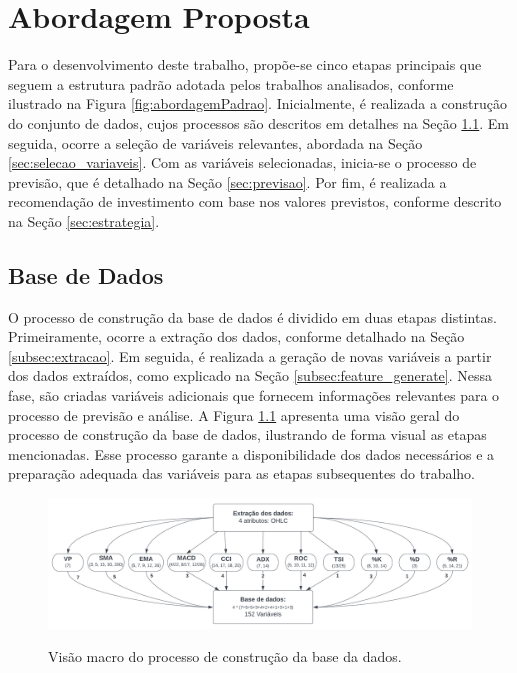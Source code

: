 \chapter{Abordagem Proposta}
\label{cap:abordagem_proposta}

Para o desenvolvimento deste trabalho, propõe-se cinco etapas principais que seguem a estrutura padrão adotada pelos trabalhos analisados, conforme ilustrado na Figura \ref{fig:abordagemPadrao}. Inicialmente, é realizada a construção do conjunto de dados, cujos processos são descritos em detalhes na Seção \ref{sec:base_dados}. Em seguida, ocorre a seleção de variáveis relevantes, abordada na Seção \ref{sec:selecao_variaveis}. Com as variáveis selecionadas, inicia-se o processo de previsão, que é detalhado na Seção \ref{sec:previsao}. Por fim, é realizada a recomendação de investimento com base nos valores previstos, conforme descrito na Seção \ref{sec:estrategia}. 


\section{Base de Dados}
\label{sec:base_dados}
O processo de construção da base de dados é dividido em duas etapas distintas. Primeiramente, ocorre a extração dos dados, conforme detalhado na Seção \ref{subsec:extracao}. Em seguida, é realizada a geração de novas variáveis a partir dos dados extraídos, como explicado na Seção \ref{subsec:feature_generate}. Nessa fase, são criadas variáveis adicionais que fornecem informações relevantes para o processo de previsão e análise. A Figura \ref{fig:base_dados} apresenta uma visão geral do processo de construção da base de dados, ilustrando de forma visual as etapas mencionadas. Esse processo garante a disponibilidade dos dados necessários e a preparação adequada das variáveis para as etapas subsequentes do trabalho.

\begin{figure}[htbp]
    \caption{Visão macro do processo de construção da base da dados.}
      \centering
    \includegraphics[width=.99\linewidth]{sections/images/base_dados.png} 
    \label{fig:base_dados}
\end{figure}


